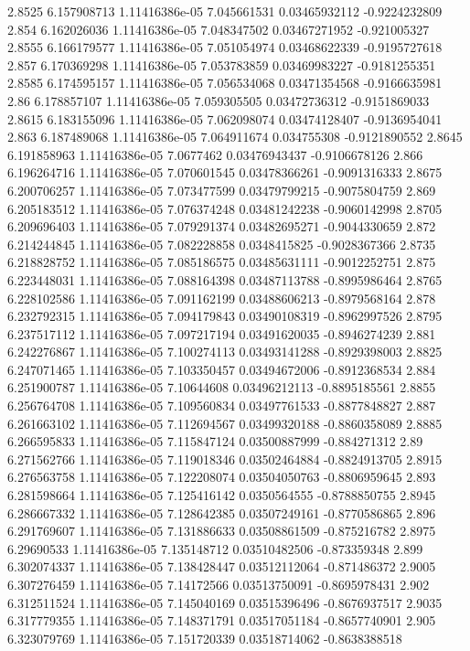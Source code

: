 {2.8525 6.157908713 1.11416386e-05 7.045661531 0.03465932112 -0.9224232809
2.854 6.162026036 1.11416386e-05 7.048347502 0.03467271952 -0.921005327
2.8555 6.166179577 1.11416386e-05 7.051054974 0.03468622339 -0.9195727618
2.857 6.170369298 1.11416386e-05 7.053783859 0.03469983227 -0.9181255351
2.8585 6.174595157 1.11416386e-05 7.056534068 0.03471354568 -0.9166635981
2.86 6.178857107 1.11416386e-05 7.059305505 0.03472736312 -0.9151869033
2.8615 6.183155096 1.11416386e-05 7.062098074 0.03474128407 -0.9136954041
2.863 6.187489068 1.11416386e-05 7.064911674 0.034755308 -0.9121890552
2.8645 6.191858963 1.11416386e-05 7.0677462 0.03476943437 -0.9106678126
2.866 6.196264716 1.11416386e-05 7.070601545 0.03478366261 -0.9091316333
2.8675 6.200706257 1.11416386e-05 7.073477599 0.03479799215 -0.9075804759
2.869 6.205183512 1.11416386e-05 7.076374248 0.03481242238 -0.9060142998
2.8705 6.209696403 1.11416386e-05 7.079291374 0.03482695271 -0.9044330659
2.872 6.214244845 1.11416386e-05 7.082228858 0.0348415825 -0.9028367366
2.8735 6.218828752 1.11416386e-05 7.085186575 0.03485631111 -0.9012252751
2.875 6.223448031 1.11416386e-05 7.088164398 0.03487113788 -0.8995986464
2.8765 6.228102586 1.11416386e-05 7.091162199 0.03488606213 -0.8979568164
2.878 6.232792315 1.11416386e-05 7.094179843 0.03490108319 -0.8962997526
2.8795 6.237517112 1.11416386e-05 7.097217194 0.03491620035 -0.8946274239
2.881 6.242276867 1.11416386e-05 7.100274113 0.03493141288 -0.8929398003
2.8825 6.247071465 1.11416386e-05 7.103350457 0.03494672006 -0.8912368534
2.884 6.251900787 1.11416386e-05 7.10644608 0.03496212113 -0.8895185561
2.8855 6.256764708 1.11416386e-05 7.109560834 0.03497761533 -0.8877848827
2.887 6.261663102 1.11416386e-05 7.112694567 0.03499320188 -0.8860358089
2.8885 6.266595833 1.11416386e-05 7.115847124 0.03500887999 -0.884271312
2.89 6.271562766 1.11416386e-05 7.119018346 0.03502464884 -0.8824913705
2.8915 6.276563758 1.11416386e-05 7.122208074 0.03504050763 -0.8806959645
2.893 6.281598664 1.11416386e-05 7.125416142 0.0350564555 -0.8788850755
2.8945 6.286667332 1.11416386e-05 7.128642385 0.03507249161 -0.8770586865
2.896 6.291769607 1.11416386e-05 7.131886633 0.03508861509 -0.875216782
2.8975 6.29690533 1.11416386e-05 7.135148712 0.03510482506 -0.873359348
2.899 6.302074337 1.11416386e-05 7.138428447 0.03512112064 -0.871486372
2.9005 6.307276459 1.11416386e-05 7.14172566 0.03513750091 -0.8695978431
2.902 6.312511524 1.11416386e-05 7.145040169 0.03515396496 -0.8676937517
2.9035 6.317779355 1.11416386e-05 7.148371791 0.03517051184 -0.8657740901
2.905 6.323079769 1.11416386e-05 7.151720339 0.03518714062 -0.8638388518
}
